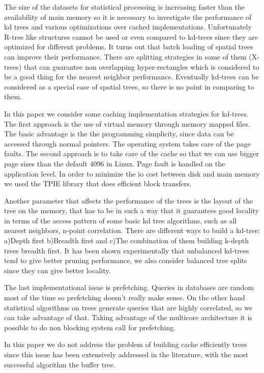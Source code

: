 \documentclass[12pt,letterpaper,doublespaced,ETD,dvips,proposal]{gtthesis}
\begin{document}
\begin{Body}
The size of the datasets for statistical processing is increasing
faster than the availability of  main memory so it is necessary to
investigate the performance of kd trees and various optimizations
over cached implementations. Unfortunately R-tree like structures
cannot be used or even compared to kd-trees since they are optimized
for different problems. It turns out that batch loading of spatial
trees can improve their performance. There are splitting strategies
in some of them (X-trees) that can guarantee non overlapping
hyper-rectangles which is considered to be a good thing for the
nearest neighbor performance. Eventually kd-trees can be considered
as a special case of spatial trees, so there is no point in
comparing to them.

In this paper we consider some caching implementation strategies for
kd-trees. The first approach is the use of virtual memory through
memory mapped files. The basic advantage is the the programming
simplicity, since data can be accessed through normal pointers. The
operating system takes care of the page faults. The second approach
is to take care of the cache so that we can use bigger page sizes
than the default 4096 in Linux. Page fault is handled on the
application level. In order to minimize the io cost between disk and
main memory we used the TPIE library that does efficient block
transfers.

Another parameter that affects the performance of the trees is the
layout of the tree on the memory, that has to be in such a way that
it guarantees good locality in terms of the access pattern of some
basic kd tree algorithms, such as all  nearest neighbors, n-point
correlation. There are different ways to build a kd-tree: a)Depth
first b)Breadth first and c)The combination of them building k-depth
trees breadth first. It has been shown experimentally that
unbalanced kd-trees tend to give better pruning performance, we also
consider balanced tree splits since they can give better locality.

The last implementational issue is prefetching.  Queries in
databases are random most of the time so prefetching doesn't really
make sense. On the other hand statistical algorithms on trees
generate queries that are highly correlated, so we can take
advantage of that. Taking advantage of the multicore architecture it
is possible to do non blocking system call for prefetching.

In this paper we do not address the problem of building cache
efficiently trees since this issue has been extensively addressed in
the literature, with the most successful algorithm the buffer tree.


\end{Body}
\end{document}
